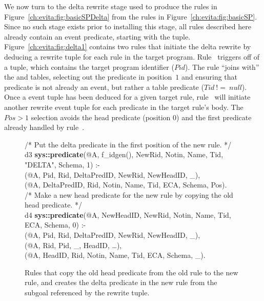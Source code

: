 We now turn to the delta rewrite \OVERLOG stage used to produce the rules in
Figure~\ref{ch:evita:fig:basicSPDelta} from the rules in
Figure~\ref{ch:evita:fig:basicSP}.  Since no such stage exists prior to
installing this stage, all rules described here already contain an event
predicate, starting with the  tuple.
Figure~\ref{ch:evita:fig:delta1} contains two rules that initiate the delta
rewrite by deducing a rewrite tuple for each rule in the target program.
Rule~ triggers off of a  tuple, which contains
the target program identifier ($Pid$).  The rule ``joins with'' the 
and  tables, selecting out the predicate in position~$1$ and
ensuring that predicate is not already an event, but rather a table predicate
($Tid\ !=\ null$).  Once a  event tuple has been deduced for a
given target rule, rule~ will initiate another rewrite event tuple for
each predicate in the target rule's body.  The $Pos > 1$ selection avoids the
head predicate (position $0$) and the first predicate already handled by
rule~.

\begin{figure}[!t]
\ssp
\centering
\begin{boxedminipage}{\linewidth}
/* Put the delta predicate in the first position of the new rule. */ \\
d3 {\bf sys::predicate}(@A, f\_idgen(), NewRid, Notin, Name, Tid, "DELTA", Schema, 1) :- \\
(@A, Pid, Rid, DeltaPredID, NewRid, NewHeadID, \_), \\
(@A, DeltaPredID, Rid, Notin, Name, Tid, ECA, Schema, Pos). \\

/* Make a new head predicate for the new rule by copying the old head predicate. */ \\
d4 {\bf sys::predicate}(@A, NewHeadID, NewRid, Notin, Name, Tid, ECA, Schema, 0) :- \\
(@A, Pid, Rid, DeltaPredID, NewRid, NewHeadID, \_), \\
(@A, Rid, Pid, \_, HeadID, \ldots), \\
(@A, HeadID, Rid, Notin, Name, Tid, ECA, Schema, \_).

\end{boxedminipage}
\caption{\label{ch:evita:fig:delta2}Rules that copy the old head predicate from the old rule
to the new rule, and creates the delta predicate in the new rule from the subgoal referenced
by the rewrite tuple.}
\end{figure}

